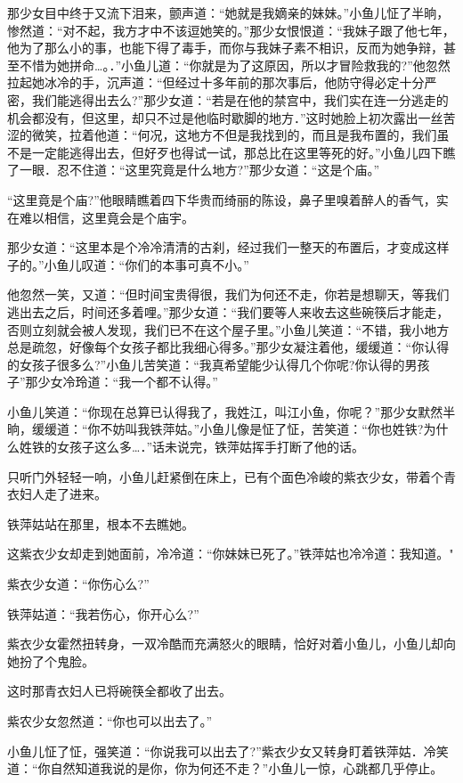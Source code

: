 \documentclass[12pt,oneside]{book}
\begin{document}
那少女目中终于又流下泪来，颤声道：``她就是我嫡亲的妹妹。''小鱼儿怔了半晌，惨然道：``对不起，我方才中不该逗她笑的。''那少女恨恨道：``我妹子跟了他七年，他为了那么小的事，也能下得了毒手，而你与我妹子素不相识，反而为她争辩，甚至不惜为她拼命\ldots。．''小鱼儿道：``你就是为了这原因，所以才冒险救我的?''他忽然拉起她冰冷的手，沉声道：``但经过十多年前的那次事后，他防守得必定十分严密，我们能逃得出去么?''那少女道：``若是在他的禁宫中，我们实在连一分逃走的机会都没有，但这里，却只不过是他临时歇脚的地方．''这时她脸上初次露出一丝苦涩的微笑，拉着他道：``何况，这地方不但是我找到的，而且是我布置的，我们虽不是一定能逃得出去，但好歹也得试一试，那总比在这里等死的好。''小鱼儿四下瞧了一眼．忍不住道：``这里究竟是什么地方?''那少女道：``这是个庙。''

``这里竟是个庙?''他眼睛瞧着四下华贵而绮丽的陈设，鼻子里嗅着醉人的香气，实在难以相信，这里竟会是个庙宇。

那少女道：``这里本是个冷冷清清的古刹，经过我们一整天的布置后，才变成这样子的。''小鱼儿叹道：``你们的本事可真不小。''

他忽然一笑，又道：``但时间宝贵得很，我们为何还不走，你若是想聊天，等我们逃出去之后，时间还多着哩。''那少女道：``我们要等人来收去这些碗筷后才能走，否则立刻就会被人发现，我们已不在这个屋子里。''小鱼儿笑道：``不错，我小地方总是疏忽，好像每个女孩子都比我细心得多。''那少女凝注着他，缓缓道：``你认得的女孩子很多么?''小鱼儿苦笑道：``我真希望能少认得几个你呢?你认得的男孩子''那少女冷玲道：``我一个都不认得。''

小鱼儿笑道：``你现在总算已认得我了，我姓江，叫江小鱼，你呢？''那少女默然半晌，缓缓道：``你不妨叫我铁萍姑。''小鱼儿像是怔了怔，苦笑道：``你也姓铁?为什么姓铁的女孩子这么多\ldots．''话未说完，铁萍姑挥手打断了他的话。

只听门外轻轻一响，小鱼儿赶紧倒在床上，已有个面色冷峻的紫衣少女，带着个青衣妇人走了进来。

铁萍姑站在那里，根本不去瞧她。

这紫衣少女却走到她面前，冷冷道：``你妹妹已死了。''铁萍姑也冷冷道：我知道。"

紫衣少女道：``你伤心么?''

铁萍姑道：``我若伤心，你开心么?''

紫衣少女霍然扭转身，一双冷酷而充满怒火的眼睛，恰好对着小鱼儿，小鱼儿却向她扮了个鬼脸。

这时那青衣妇人已将碗筷全都收了出去。

紫农少女忽然道：``你也可以出去了。''

小鱼儿怔了怔，强笑道：``你说我可以出去了?''紫衣少女又转身盯着铁萍姑．冷笑道：``你自然知道我说的是你，你为何还不走？''小鱼儿一惊，心跳都几乎停止。
\end{document}
